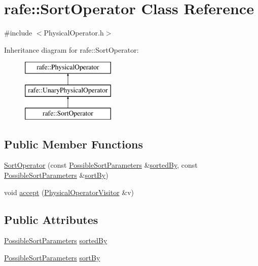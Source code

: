 \hypertarget{classrafe_1_1_sort_operator}{\section{rafe\+:\+:Sort\+Operator Class Reference}
\label{classrafe_1_1_sort_operator}
}


{\ttfamily \#include $<$Physical\+Operator.\+h$>$}

Inheritance diagram for rafe\+:\+:Sort\+Operator\+:\begin{figure}[H]
\begin{center}
\leavevmode
\includegraphics[height=3.000000cm]{classrafe_1_1_sort_operator}
\end{center}
\end{figure}
\subsection*{Public Member Functions}
\begin{DoxyCompactItemize}
\item 
\hyperlink{classrafe_1_1_sort_operator_a52c1e06b77fe1e15a32a99fe5c58209a}{Sort\+Operator} (const \hyperlink{classrafe_1_1_possible_sort_parameters}{Possible\+Sort\+Parameters} \&\hyperlink{classrafe_1_1_sort_operator_a5fc719069fac1fa039542a994f3bf516}{sorted\+By}, const \hyperlink{classrafe_1_1_possible_sort_parameters}{Possible\+Sort\+Parameters} \&\hyperlink{classrafe_1_1_sort_operator_a9fcd0871eb338c0c589e557993ffe7d3}{sort\+By})
\item 
void \hyperlink{classrafe_1_1_sort_operator_ad2d3e9864cd1876d417a66b220b8dcb6}{accept} (\hyperlink{classrafe_1_1_physical_operator_visitor}{Physical\+Operator\+Visitor} \&v)
\end{DoxyCompactItemize}
\subsection*{Public Attributes}
\begin{DoxyCompactItemize}
\item 
\hyperlink{classrafe_1_1_possible_sort_parameters}{Possible\+Sort\+Parameters} \hyperlink{classrafe_1_1_sort_operator_a5fc719069fac1fa039542a994f3bf516}{sorted\+By}
\item 
\hyperlink{classrafe_1_1_possible_sort_parameters}{Possible\+Sort\+Parameters} \hyperlink{classrafe_1_1_sort_operator_a9fcd0871eb338c0c589e557993ffe7d3}{sort\+By}
\end{DoxyCompactItemize}


